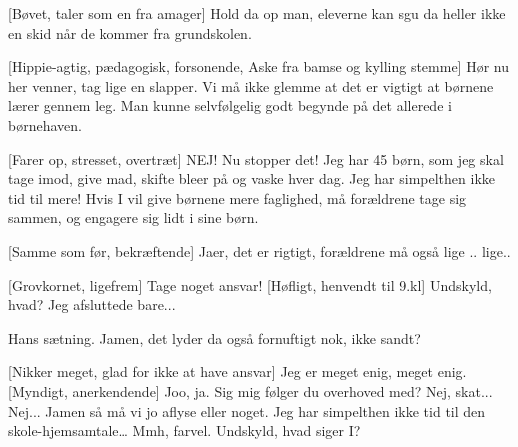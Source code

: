 \documentclass[a4paper,11pt]{article}
\begin{document}
\begin{sketch}
[Bøvet, taler som en fra amager] Hold da op man, eleverne kan sgu da heller ikke en skid når de kommer fra grundskolen.

[Hippie-agtig, pædagogisk, forsonende, Aske fra bamse og kylling stemme] Hør nu her venner, tag lige en slapper. Vi må ikke glemme at det er vigtigt at børnene lærer gennem leg.  Man kunne selvfølgelig godt begynde på det allerede i børnehaven. 

[Farer op, stresset, overtræt] NEJ! Nu stopper det! Jeg har 45 børn, som jeg skal tage imod, give mad, skifte bleer på og vaske hver dag. Jeg har simpelthen ikke tid til mere! Hvis I vil give børnene mere faglighed, må forældrene tage sig sammen, og engagere sig lidt i sine børn.

[Samme som før, bekræftende] Jaer, det er rigtigt, forældrene må også lige .. lige.. 

[Grovkornet, ligefrem] Tage noget ansvar!
[Høfligt, henvendt til 9.kl] Undskyld, hvad?
 Jeg afsluttede bare... 

 Hans sætning. Jamen, det lyder da også fornuftigt nok, ikke sandt? 

[Nikker meget, glad for ikke at have ansvar] Jeg er meget enig, meget enig.
[Myndigt, anerkendende] Joo, ja.  Sig mig følger du overhoved med? 
 Nej, skat... Nej... Jamen så må vi jo aflyse eller noget. Jeg har simpelthen ikke tid til den skole-hjemsamtale… Mmh, farvel.  Undskyld, hvad siger I?


\end{sketch}
\end{document}
